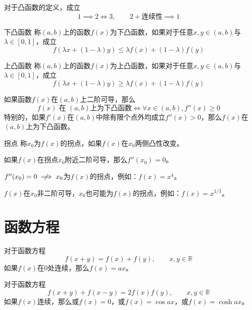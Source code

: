\documentclass[lang = cn, scheme = chinese, thmcnt = section]{elegantbook}
\newcommand{\R}{\mathbb{R}}            %
\begin{document}
\begin{theorem}
	对于凸函数的定义，成立
	$$
	1\implies 2\iff 3,\qquad 
	2+\text{连续性}\implies 1
	$$
\end{theorem}

\begin{definition}{下凸函数}
	称$(a,b)$上的函数$f(x)$为下凸函数，如果对于任意$x,y\in (a,b)$与$\lambda\in [0,1]$，成立
	$$
	f(\lambda x+(1-\lambda)y)
	\le 
	\lambda f(x)+(1-\lambda)f(y)
	$$
\end{definition}

\begin{definition}{上凸函数}
	称$(a,b)$上的函数$f(x)$为上凸函数，如果对于任意$x,y\in (a,b)$与$\lambda\in [0,1]$，成立
	$$
	f(\lambda x+(1-\lambda)y)
	\ge 
	\lambda f(x)+(1-\lambda)f(y)
	$$
\end{definition}

\begin{theorem}
	如果函数$f(x)$在$(a,b)$上二阶可导，那么
	$$
	f(x)\text{ 在 }(a,b)\text{上为下凸函数}
	\iff 
	\forall x\in (a,b),f''(x)\ge 0
	$$
	特别的，如果$f'(x)$在$(a,b)$中除有限个点外均成立$f''(x)>0$，那么$f(x)$在$(a,b)$上为下凸函数。
\end{theorem}

\begin{definition}{拐点}
	称$x_0$为$f(x)$的拐点，如果$f(x)$在$x_0$两侧凸性改变。
\end{definition}

\begin{note}
	如果$f(x)$在拐点$x_0$附近二阶可导，那么$f''(x_0)=0$。
	
	$f''(x_0)=0\centernot\implies x_0$为$f(x)$的拐点，例如：$f(x)=x^4$。
	
	$f(x)$在$x_0$非二阶可导，$x_0$也可能为$f(x)$的拐点，例如：$f(x)=x^{1/3}$。
\end{note}

\section{函数方程}

\begin{theorem}
	对于函数方程
	$$
	f(x+y)=f(x)+f(y),\qquad x,y\in\R
	$$
	如果$f(x)$在$0$处连续，那么$f(x)=ax$。
\end{theorem}

\begin{theorem}
	对于函数方程
	$$
	f(x+y)+f(x-y)=2f(x)f(y),\qquad x,y\in\R
	$$
	如果$f(x)$连续，那么或$f(x)=0$，或$f(x)=\cos ax$，或$f(x)=\cosh ax$。
\end{theorem}
\end{document}
